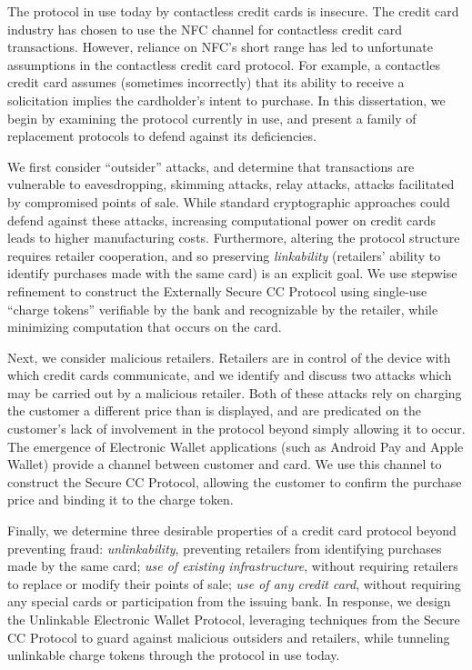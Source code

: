 The protocol in use today by contactless credit cards is insecure.
The credit card industry has chosen to use the NFC channel for contactless credit card transactions.
However, reliance on NFC's short range has led to unfortunate assumptions in the contactless credit card protocol.
For example, a contactles credit card assumes (sometimes incorrectly) that its ability to receive a solicitation implies the cardholder's intent to purchase.
In this dissertation, we begin by examining the protocol currently in use,
    and present a family of replacement protocols to defend against its deficiencies.

We first consider ``outsider'' attacks, and determine that transactions are vulnerable to
    eavesdropping, skimming attacks, relay attacks, attacks facilitated by compromised points of sale.
While standard cryptographic approaches could defend against these attacks,
    increasing computational power on credit cards leads to higher manufacturing costs.
Furthermore, altering the protocol structure requires retailer cooperation,
    and so preserving \emph{linkability} (retailers' ability to identify purchases made with the same card) is an explicit goal.
We use stepwise refinement to construct the Externally Secure CC Protocol using single-use ``charge tokens'' verifiable by the bank and recognizable by the retailer,
    while minimizing computation that occurs on the card.

Next, we consider malicious retailers.
Retailers are in control of the device with which credit cards communicate,
    and we identify and discuss two attacks which may be carried out by a malicious retailer.
Both of these attacks rely on charging the customer a different price than is displayed,
    and are predicated on the customer's lack of involvement in the protocol beyond simply allowing it to occur.
The emergence of Electronic Wallet applications (such as Android Pay and Apple Wallet) provide a channel between customer and card.
We use this channel to construct the Secure CC Protocol,
    allowing the customer to confirm the purchase price and binding it to the charge token.

Finally, we determine three desirable properties of a credit card protocol beyond preventing fraud:
    \emph{unlinkability}, preventing retailers from identifying purchases made by the same card;
    \emph{use of existing infrastructure}, without requiring retailers to replace or modify their points of sale;
    \emph{use of any credit card}, without requiring any special cards or participation from the issuing bank.
In response, we design the Unlinkable Electronic Wallet Protocol,
    leveraging techniques from the Secure CC Protocol to guard against malicious outsiders and retailers,
    while tunneling unlinkable charge tokens through the protocol in use today.